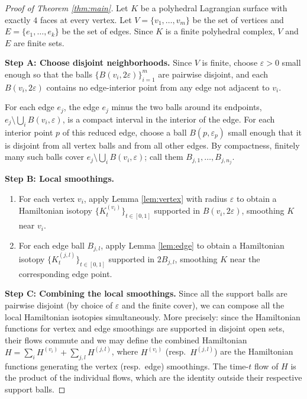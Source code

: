 \documentclass[12pt]{article}
\theoremstyle{definition}
\begin{document}
\begin{proof}[Proof of Theorem \ref{thm:main}]
Let $K$ be a polyhedral Lagrangian surface with exactly $4$ faces at every vertex. Let $V = \{v_1,\ldots,v_m\}$ be the set of vertices and $E = \{e_1,\ldots,e_k\}$ be the set of edges. Since $K$ is a finite polyhedral complex, $V$ and $E$ are finite sets.

\medskip
\noindent\textbf{Step A: Choose disjoint neighborhoods.} Since $V$ is finite, choose $\varepsilon > 0$ small enough so that the balls $\{B(v_i, 2\varepsilon)\}_{i=1}^m$ are pairwise disjoint, and each $B(v_i,2\varepsilon)$ contains no edge-interior point from any edge not adjacent to $v_i$.

For each edge $e_j$, the edge $e_j$ minus the two balls around its endpoints, $e_j \setminus \bigcup_i B(v_i,\varepsilon)$, is a compact interval in the interior of the edge. For each interior point $p$ of this reduced edge, choose a ball $B(p, \varepsilon_p)$ small enough that it is disjoint from all vertex balls and from all other edges. By compactness, finitely many such balls cover $e_j \setminus \bigcup_i B(v_i,\varepsilon)$; call them $B_{j,1},\ldots,B_{j,n_j}$.

\medskip
\noindent\textbf{Step B: Local smoothings.}
\begin{enumerate}
  \item For each vertex $v_i$, apply Lemma \ref{lem:vertex} with radius $\varepsilon$ to obtain a Hamiltonian isotopy $\{K_t^{(v_i)}\}_{t\in[0,1]}$ supported in $B(v_i,2\varepsilon)$, smoothing $K$ near $v_i$.
  \item For each edge ball $B_{j,l}$, apply Lemma \ref{lem:edge} to obtain a Hamiltonian isotopy $\{K_t^{(j,l)}\}_{t\in[0,1]}$ supported in $2B_{j,l}$, smoothing $K$ near the corresponding edge point.
\end{enumerate}

\medskip
\noindent\textbf{Step C: Combining the local smoothings.}
Since all the support balls are pairwise disjoint (by choice of $\varepsilon$ and the finite cover), we can compose all the local Hamiltonian isotopies simultaneously. More precisely: since the Hamiltonian functions for vertex and edge smoothings are supported in disjoint open sets, their flows commute and we may define the combined Hamiltonian $H = \sum_i H^{(v_i)} + \sum_{j,l} H^{(j,l)}$, where $H^{(v_i)}$ (resp.\ $H^{(j,l)}$) are the Hamiltonian functions generating the vertex (resp.\ edge) smoothings. The time-$t$ flow of $H$ is the product of the individual flows, which are the identity outside their respective support balls.


\end{proof}
\end{document}
